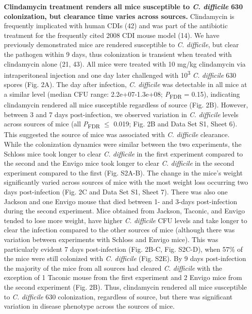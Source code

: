 \documentclass[
  11pt,
]{article}
\begin{document}
\textbf{Clindamycin treatment renders all mice susceptible to \emph{C.
difficile} 630 colonization, but clearance time varies across sources.}
Clindamycin is frequently implicated with human CDIs (42) and was part
of the antibiotic treatment for the frequently cited 2008 CDI mouse
model (14). We have previously demonstrated mice are rendered
susceptible to \emph{C. difficile}, but clear the pathogen within 9
days, thus colonization is transient when treated with clindamycin alone
(21, 43). All mice were treated with 10 mg/kg clindamycin via
intraperitoneal injection and one day later challenged with
10\textsuperscript{3} \emph{C. difficile} 630 spores (Fig. 2A). The day
after infection, \emph{C. difficile} was detectable in all mice at a
similar level (median CFU range: 2.2e+07-1.3e+08;
\emph{P}\textsubscript{FDR} = 0.15), indicating clindamycin rendered all
mice susceptible regardless of source (Fig. 2B). However, between 3 and
7 days post-infection, we observed variation in \emph{C. difficile}
levels across sources of mice (all \emph{P}\textsubscript{FDR} \(\le\)
0.019; Fig. 2B and Data Set S1, Sheet 6). This suggested the source of
mice was associated with \emph{C. difficile} clearance. While the
colonization dynamics were similar between the two experiments, the
Schloss mice took longer to clear \emph{C. difficile} in the first
experiment compared to the second and the Envigo mice took longer to
clear \emph{C. difficile} in the second experiment compared to the first
(Fig. S2A-B). The change in the mice's weight significantly varied
across sources of mice with the most weight loss occurring two days
post-infection (Fig. 2C and Data Set S1, Sheet 7). There was also one
Jackson and one Envigo mouse that died between 1- and 3-days
post-infection during the second experiment. Mice obtained from Jackson,
Taconic, and Envigo tended to lose more weight, have higher \emph{C.
difficile} CFU levels and take longer to clear the infection compared to
the other sources of mice (although there was variation between
experiments with Schloss and Envigo mice). This was particularly evident
7 days post-infection (Fig. 2B-C, Fig. S2C-D), when 57\% of the mice
were still colonized with \emph{C. difficile} (Fig. S2E). By 9 days
post-infection the majority of the mice from all sources had cleared
\emph{C. difficile} with the exception of 1 Taconic mouse from the first
experiment and 2 Envigo mice from the second experiment (Fig. 2B). Thus,
clindamycin rendered all mice susceptible to \emph{C. difficile} 630
colonization, regardless of source, but there was significant variation
in disease phenotype across the sources of mice.
\end{document}

